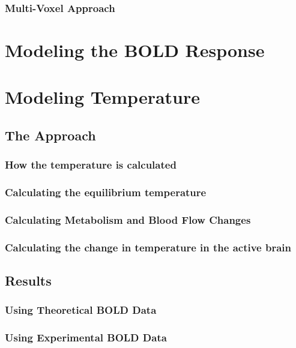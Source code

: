     
    \subsubsection{\label{sss:multivoxel}Multi-Voxel Approach}
  


\section{Modeling the BOLD Response}

\section{Modeling Temperature}
  \subsection{The Approach}
    \subsubsection{How the temperature is calculated}
    \subsubsection{Calculating the equilibrium temperature}
    \subsubsection{Calculating Metabolism and Blood Flow Changes}
    \subsubsection{Calculating the change in temperature in the active brain}
  \subsection{Results}
    \subsubsection{Using Theoretical BOLD Data}
    \subsubsection{Using Experimental BOLD Data}
